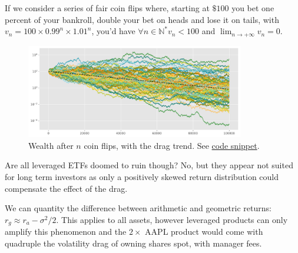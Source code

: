 If we consider a series of fair coin flips where, starting at $\$100$ you bet one percent of your bankroll, double your bet on heads and lose it on tails, with $v_n=100\times 0.99^{n} \times 1.01^n$, you'd have $\forall n \in \mathbb{N}^{*} v_n < 100$ and $\lim_{n \to +\infty} v_n = 0$.

\begin{figure}[H]
    \includegraphics[width=0.85\textwidth]{include/img/coin_flip_drag.png}
    \centering
    \caption{Wealth after $n$ coin flips, with the drag trend. See \href{https://github.com/vtisserand/quant_itws/tree/main/code/snippets/coin_flip_drag.py}{code snippet}.}
    \label{fig:coin_flip_drag}
\end{figure}

Are all leveraged ETFs doomed to ruin though? No, but they appear not suited for long term investors as only a positively skewed return distribution could compensate the effect of the drag.

We can quantity the difference between arithmetic and geometric returns: $r_g \approx r_a - \sigma^2/2$. This applies to all assets, however leveraged products can only amplify this phenomenon and the $2\times$ AAPL product would come with quadruple the volatility drag of owning shares spot, with manager fees.